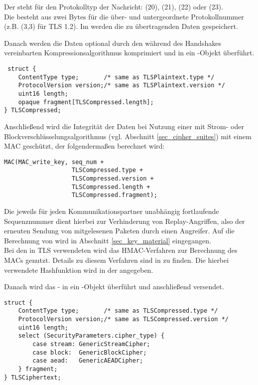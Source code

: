 Der  steht für den Protokolltyp der Nachricht: \changecipherspecprotocol{} (20), \alertprotocol{} (21), \handshakeprotocol{} (22) oder \applicationdataprotocol{} (23). \\
Die  besteht aus zwei Bytes für die über- und untergeordnete Protokollnummer (z.B. (3,3) für TLS 1.2). Im  werden die zu übertragenden Daten gespeichert.

Danach werden die Daten optional durch den während des Handshakes vereinbarten Kompressionsalgorithmus komprimiert und in ein -Objekt überführt.

\begin{lstlisting}
 struct {
	ContentType type;       /* same as TLSPlaintext.type */
	ProtocolVersion version;/* same as TLSPlaintext.version */
	uint16 length;
	opaque fragment[TLSCompressed.length];
} TLSCompressed;
\end{lstlisting}

Anschließend wird die Integrität der Daten bei Nutzung einer \ciphersuite{} mit Strom- oder Blockverschlüsselungsalgorithmus (vgl. Abschnitt \ref{sec_cipher_suites}) mit einem MAC geschützt, der folgendermaßen berechnet wird:
\begin{lstlisting}
MAC(MAC_write_key, seq_num +
				   TLSCompressed.type +
				   TLSCompressed.version +
				   TLSCompressed.length +
				   TLSCompressed.fragment);
\end{lstlisting}
Die jeweils für jeden Kommunikationspartner unabhängig fortlaufende Sequenznummer  dient hierbei zur Verhinderung von Replay-Angriffen, also der erneuten Sendung von mitgelesenen Paketen durch einen Angreifer. Auf die Berechnung von  wird in Abschnitt \ref{sec_key_material} eingegangen.\\
Bei den in TLS verwendeten \ciphersuites{} wird das HMAC-Verfahren zur Berechnung des MACs genutzt. Details zu diesem Verfahren sind in \cite{hmac97} zu finden. Die hierbei verwendete Hashfunktion wird in der \ciphersuite{} angegeben. 

Danach wird das - in ein -Objekt überführt und anschließend versendet.

\begin{lstlisting}
struct {
	ContentType type;       /* same as TLSCompressed.type */
	ProtocolVersion version;/* same as TLSCompressed.version */
	uint16 length;
	select (SecurityParameters.cipher_type) {
	    case stream: GenericStreamCipher;
	    case block:  GenericBlockCipher;
	    case aead:   GenericAEADCipher;
	} fragment;
} TLSCiphertext;
\end{lstlisting}

